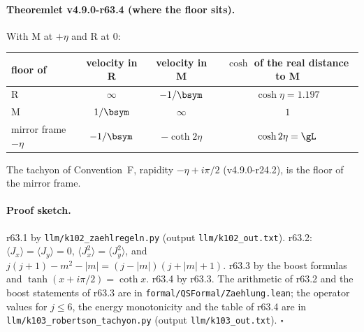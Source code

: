 \paragraph{Theoremlet v4.9.0-r63.4 (where the floor sits).}
With M at \(+\eta\) and R at \(0\):
\begin{center}
\small
\begin{tabular}{@{}lccc@{}}
\toprule
floor of & velocity in R & velocity in M & \(\cosh\) of the real distance to M\\
\midrule
R & \(\infty\) & \(-1/\bsym\) & \(\cosh\eta=1.197\)\\
M & \(1/\bsym\) & \(\infty\) & \(1\)\\
mirror frame \(-\eta\) & \(-1/\bsym\) & \(-\coth2\eta\) & \(\cosh2\eta=\gL\)\\
\bottomrule
\end{tabular}
\end{center}
The tachyon of Convention~F, rapidity \(-\eta+i\pi/2\) (v4.9.0-r24.2), is the floor of the mirror frame.

\paragraph{Proof sketch.}
r63.1 by \texttt{llm/k102\_zaehlregeln.py} (output \texttt{llm/k102\_out.txt}).  r63.2: \(\langle J_x\rangle=\langle J_y\rangle=0\), \(\langle J_x^2\rangle=\langle J_y^2\rangle\), and
\(j(j+1)-m^2-|m|=(j-|m|)(j+|m|+1)\).  r63.3 by the boost formulas and \(\tanh(x+i\pi/2)=\coth x\).  r63.4 by r63.3.  The arithmetic of r63.2 and the boost statements of r63.3
are in \texttt{formal/QSFormal/Zaehlung.lean}; the operator values for \(j\le6\), the energy monotonicity and the table of r63.4 are in \texttt{llm/k103\_robertson\_tachyon.py}
(output \texttt{llm/k103\_out.txt}).  \(\square\)

